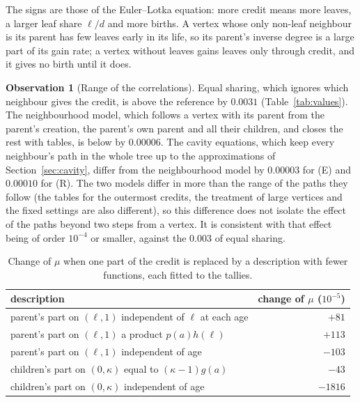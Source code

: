 \documentclass[11pt]{article}
\theoremstyle{plain}
\theoremstyle{definition}
\newtheorem{observation}[theorem]{Observation}
\theoremstyle{remark}
\begin{document}
The signs are those of the Euler--Lotka equation: more credit means more leaves, a larger leaf share $\ell/d$ and more births. A vertex whose only non-leaf neighbour is its parent has few leaves early in its life, so its parent's inverse degree is a large part of its gain rate; a vertex without leaves gains leaves only through credit, and it gives no birth until it does.

\begin{observation}[Range of the correlations]\label{obs:range}
Equal sharing, which ignores which neighbour gives the credit, is above the reference by $0.0031$ (Table~\ref{tab:values}). The neighbourhood model, which follows a vertex with its parent from the parent's creation, the parent's own parent and all their children, and closes the rest with tables, is below by $0.00006$. The cavity equations, which keep every neighbour's path in the whole tree up to the approximations of Section~\ref{sec:cavity}, differ from the neighbourhood model by $0.00003$ for (E) and $0.00010$ for (R). The two models differ in more than the range of the paths they follow (the tables for the outermost credits, the treatment of large vertices and the fixed settings are also different), so this difference does not isolate the effect of the paths beyond two steps from a vertex. It is consistent with that effect being of order $10^{-4}$ or smaller, against the $0.003$ of equal sharing.
\end{observation}

\begin{table}[H]
\centering
\begin{tabular}{lr}
\toprule
description & change of $\mu$ ($10^{-5}$)\\
\midrule
parent's part on $(\ell,1)$ independent of $\ell$ at each age & $+81$\\
parent's part on $(\ell,1)$ a product $p(a)h(\ell)$ & $+113$\\
parent's part on $(\ell,1)$ independent of age & $-103$\\
children's part on $(0,\kappa)$ equal to $(\kappa-1)g(a)$ & $-43$\\
children's part on $(0,\kappa)$ independent of age & $-1816$\\
\bottomrule
\end{tabular}
\caption{Change of $\mu$ when one part of the credit is replaced by a description with fewer functions, each fitted to the tallies.}\label{tab:desc}
\end{table}
\end{document}
